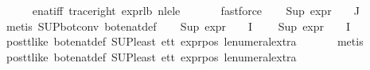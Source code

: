 \begin{isabellebody}
\ \ \ \ \isamarkupfalse%
\ enat{\isacharunderscore}{\kern0pt}{}{\isacharunderscore}{\kern0pt}iff{\isacharparenleft}{\kern0pt}{}{\isacharparenright}{\kern0pt}\ trace{\isacharunderscore}{\kern0pt}right\ expr{\isacharunderscore}{\kern0pt}{}{\isacharunderscore}{\kern0pt}lb\ nle{\isacharunderscore}{\kern0pt}le\ \isanewline
\ \ \ \ \isamarkupfalse%
\ fastforce{\isacharplus}{\kern0pt}\isanewline
\ \ \isamarkupfalse%
\ {\isachardoublequoteopen}Sup\ {\isacharparenleft}{\kern0pt}expr{\isacharunderscore}{\kern0pt}{}\ {\isacharbackquote}{\kern0pt}\ {\isasymPhi}\ {\isacharbackquote}{\kern0pt}\ J{\isacharparenright}{\kern0pt}\ {\isacharequal}{\kern0pt}\ {}{\isachardoublequoteclose}\isanewline
\ \ \ \ \isamarkupfalse%
\ {\isacharparenleft}{\kern0pt}metis\ SUP{\isacharunderscore}{\kern0pt}bot{\isacharunderscore}{\kern0pt}conv{\isacharparenleft}{\kern0pt}{}{\isacharparenright}{\kern0pt}\ bot{\isacharunderscore}{\kern0pt}enat{\isacharunderscore}{\kern0pt}def{\isacharparenright}{\kern0pt}\isanewline
\ \ \isamarkupfalse%
\ {\isachardoublequoteopen}Sup\ {\isacharparenleft}{\kern0pt}expr{\isacharunderscore}{\kern0pt}{}\ {\isacharbackquote}{\kern0pt}\ {\isasymPhi}\ {\isacharbackquote}{\kern0pt}\ I{\isacharparenright}{\kern0pt}\ {\isasymle}\ {}{\isachardoublequoteclose}\ \isanewline
{}\ {\isachardoublequoteopen}Sup\ {\isacharparenleft}{\kern0pt}expr{\isacharunderscore}{\kern0pt}{}\ {\isacharbackquote}{\kern0pt}\ {\isasymPhi}\ {\isacharbackquote}{\kern0pt}\ I{\isacharparenright}{\kern0pt}\ {\isasymle}\ {}{\isachardoublequoteclose}\isanewline
\ \ \ \ \isamarkupfalse%
\ pos{\isacharunderscore}{\kern0pt}tt{\isacharunderscore}{\kern0pt}like\ bot{\isacharunderscore}{\kern0pt}enat{\isacharunderscore}{\kern0pt}def\ SUP{\isacharunderscore}{\kern0pt}least\ e{}{\isacharunderscore}{\kern0pt}tt\ expr{\isacharunderscore}{\kern0pt}{}{\isacharunderscore}{\kern0pt}pos\ le{\isacharunderscore}{\kern0pt}numeral{\isacharunderscore}{\kern0pt}extra{\isacharparenleft}{\kern0pt}{}{\isacharparenright}{\kern0pt}\isanewline
\ \ \ \ \ \isamarkupfalse%
\ metis\isanewline
\ \ \ \ \isamarkupfalse%
\ pos{\isacharunderscore}{\kern0pt}tt{\isacharunderscore}{\kern0pt}like\ bot{\isacharunderscore}{\kern0pt}enat{\isacharunderscore}{\kern0pt}def\ SUP{\isacharunderscore}{\kern0pt}least\ e{}{\isacharunderscore}{\kern0pt}tt\ expr{\isacharunderscore}{\kern0pt}{}{\isacharunderscore}{\kern0pt}pos\ le{\isacharunderscore}{\kern0pt}numeral{\isacharunderscore}{\kern0pt}extra{\isacharparenleft}{\kern0pt}{}{\isacharparenright}{\kern0pt}\ \isanewline

\end{isabellebody}
